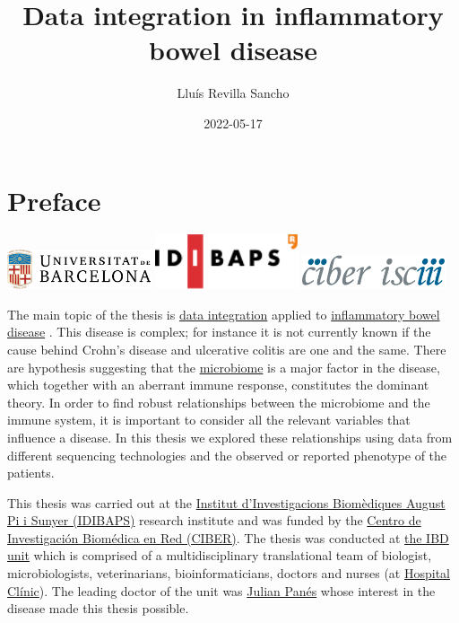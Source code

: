 \documentclass[
  12pt,
  a4paper,
  twoside,
  openright]{book}
\title{Data integration in inflammatory bowel disease}
\author{Lluís Revilla Sancho}
\date{2022-05-17}
\begin{document}
\maketitle

{
\hypersetup{linkcolor=}
\setcounter{tocdepth}{2}
\tableofcontents
}
\listoffigures
\listoftables
\hypertarget{preface}{%
\chapter*{Preface}\label{preface}}

\includegraphics[width=1.66667in,height=\textheight]{images/ub_logo.png} \includegraphics[width=1.66667in,height=\textheight]{images/idibaps_logo.png} \includegraphics[width=1.66667in,height=0.39583in]{images/logo_ciber.png}

The main topic of the thesis is \href{https://en.wikipedia.org/wiki/Data_integration}{data integration} applied to \href{https://en.wikipedia.org/wiki/Inflammatory_bowel_disease}{inflammatory bowel disease} .
This disease is complex; for instance it is not currently known if the cause behind Crohn's disease and ulcerative colitis are one and the same.
There are hypothesis suggesting that the \href{https://en.wikipedia.org/wiki/Microbiota}{microbiome} is a major factor in the disease, which together with an aberrant immune response, constitutes the dominant theory.
In order to find robust relationships between the microbiome and the immune system, it is important to consider all the relevant variables that influence a disease.
In this thesis we explored these relationships using data from different sequencing technologies and the observed or reported phenotype of the patients.

This thesis was carried out at the \href{https://www.idibaps.org/}{Institut d'Investigacions Biomèdiques August Pi i Sunyer (IDIBAPS)} research institute and was funded by the \href{https://www.ciberehd.org/}{Centro de Investigación Biomédica en Red (CIBER)}.
The thesis was conducted at \href{https://www.ibd-bcn.org/}{the IBD unit} which is comprised of a multidisciplinary translational team of biologist, microbiologists, veterinarians, bioinformaticians, doctors and nurses (at \href{https://www.clinicbarcelona.org/en}{Hospital Clínic}).
The leading doctor of the unit was \href{https://orcid.org/0000-0002-4971-6902}{Julian Panés} whose interest in the disease made this thesis possible.
\end{document}
